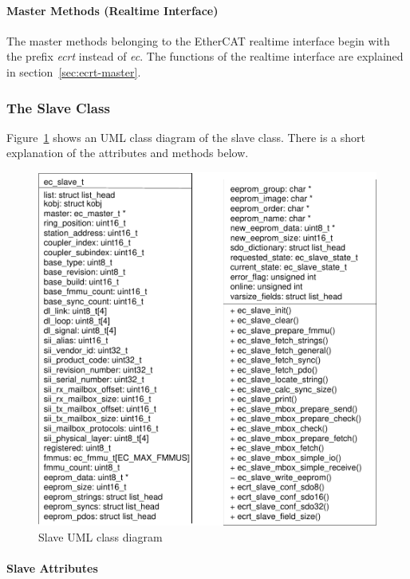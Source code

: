 \documentclass[a4paper,12pt,BCOR6mm,bibtotoc,idxtotoc]{scrbook}
\begin{document}
\paragraph{Master Methods (Realtime Interface)}

The master methods belonging to the Eth\-er\-CAT realtime
interface begin with the prefix \textit{ecrt} instead of
\textit{ec}. The functions of the realtime interface are explained in
section~\ref{sec:ecrt-master}.


\subsubsection{The Slave Class}
\label{sec:class-slave}

Figure~\ref{fig:uml-slave} shows an UML class diagram of the slave
class. There is a short explanation of the attributes and methods
below.

\begin{figure}[htbp]
  \centering
  \includegraphics[width=.8\textwidth]{images/uml-slave}
  \caption{Slave UML class diagram}
  \label{fig:uml-slave}
\end{figure}

\paragraph{Slave Attributes}
\end{document}
